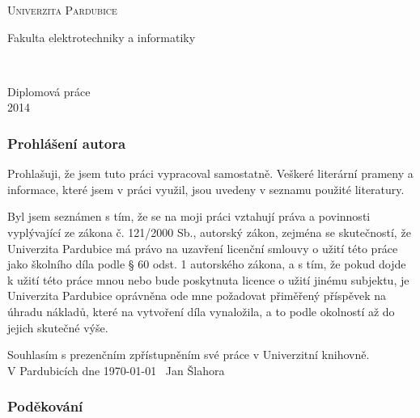 \documentclass[11pt,a4paper,fleqn,titlepage,twoside,openany]{book}
\begin{document}
\makeatletter
\begin{titlepage}
	\begin{center}
	
	\textsc{\Huge{Univerzita Pardubice}}

	\LARGE{Fakulta elektrotechniky a informatiky}
	
	\vfill
	
	\huge{\@title}\\[2mm]
	\LARGE{\@author}
	
	\vfill

	\begin{normalsize}
	Diplomová práce\\
	2014
	\end{normalsize}
	\end{center}
\end{titlepage}

\newpage  
\thispagestyle{empty}
\hspace{0pt}

\newpage 
\thispagestyle{empty}
\hspace{0pt}

\onehalfspacing

\newpage 
\thispagestyle{empty}
\subsubsection*{Prohlášení autora}

Prohlašuji, že jsem tuto práci vypracoval samostatně. Veškeré literární prameny a informace, které jsem v práci využil, jsou uvedeny v seznamu použité literatury.

Byl jsem seznámen s tím, že se na moji práci vztahují práva a povinnosti vyplývající ze zákona č. 121/2000 Sb., autorský zákon, zejména se skutečností, že Univerzita Pardubice má právo na uzavření licenční smlouvy o užití této práce jako školního díla podle § 60 odst. 1 autorského zákona, a s tím, že pokud dojde k užití této práce mnou nebo bude poskytnuta licence o užití jinému subjektu, je Univerzita Pardubice oprávněna ode mne požadovat přiměřený příspěvek na úhradu nákladů, které na vytvoření díla vynaložila, a to podle okolností až do jejich skutečné výše.

Souhlasím s prezenčním zpřístupněním své práce v Univerzitní knihovně.\\[4cm]
V Pardubicích dne \today\ \hfill{} Jan Šlahora

\newpage 
\thispagestyle{empty}
\subsubsection*{Poděkování}
\end{document}
